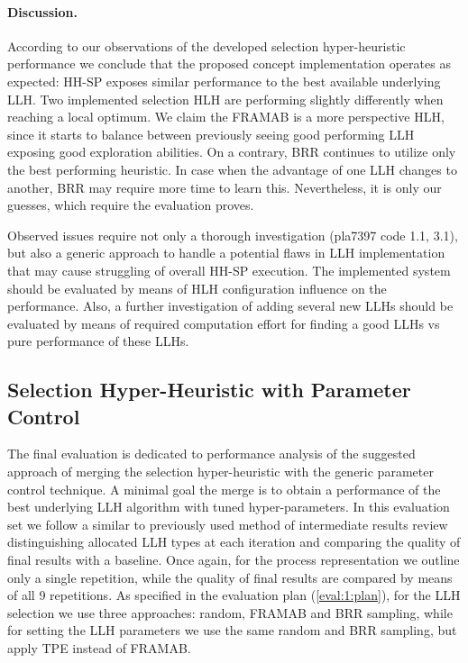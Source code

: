 \paragraph{Discussion.} According to our observations of the developed selection hyper-heuristic performance we conclude that the proposed concept implementation operates as expected: HH-SP exposes similar performance to the best available underlying LLH. Two implemented selection HLH are performing slightly differently when reaching a local optimum. We claim the FRAMAB is a more perspective HLH, since it starts to balance between previously seeing good performing LLH exposing good exploration abilities. On a contrary, BRR continues to utilize only the best performing heuristic. In case when the advantage of one LLH changes to another, BRR may require more time to learn this. Nevertheless, it is only our guesses, which require the evaluation proves.

Observed issues require not only a thorough investigation (pla7397 code 1.1, 3.1), but also a generic approach to handle a potential flaws in LLH implementation that may cause struggling of overall HH-SP execution. The implemented system should be evaluated by means of HLH configuration influence on the performance. Also, a further investigation of adding several new LLHs should be evaluated by means of required computation effort for finding a good LLHs vs pure performance of these LLHs.


\subsection{Selection Hyper-Heuristic with Parameter Control}\label{eval:1:hh-pc}
The final evaluation is dedicated to performance analysis of the suggested approach of merging the selection hyper-heuristic with the generic parameter control technique. A minimal goal the merge is to obtain a performance of the best underlying LLH algorithm with tuned hyper-parameters. In this evaluation set we follow a similar to previously used method of intermediate results review distinguishing allocated LLH types at each iteration and comparing the quality of final results with a baseline. Once again, for the process representation we outline only a single repetition, while the quality of final results are compared by means of all 9 repetitions. As specified in the evaluation plan (\cref{eval:1:plan}), for the LLH selection we use three approaches: random, FRAMAB and BRR sampling, while for setting the LLH parameters we use the same random and BRR sampling, but apply TPE instead of FRAMAB.

